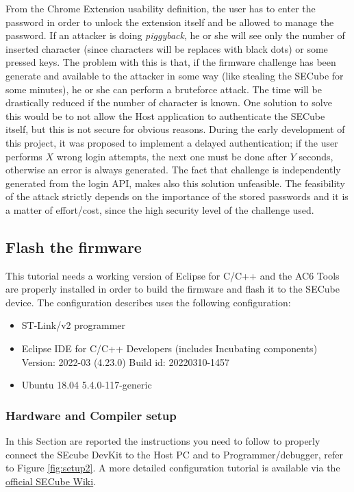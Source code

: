 From the Chrome Extension usability definition, the user has to enter the password in order to unlock the extension itself and be allowed to manage the password. If an attacker is doing \textit{piggyback}, he or she will see only the number of inserted character (since characters will be replaces with black dots) or some pressed keys. The problem with this is that, if the firmware challenge has been generate and available to the attacker in some way (like stealing the SECube for some minutes), he or she can perform a bruteforce attack. The time will be drastically reduced if the number of character is known. One solution to solve this would be to not allow the Host application to authenticate the SECube itself, but this is not secure for obvious reasons. 
During the early development of this project, it was proposed to implement a delayed authentication; if the user performs $X$ wrong login attempts, the next one must be done after $Y$ seconds, otherwise an error is always generated. The fact that challenge is independently generated from the login API, makes also this solution unfeasible. The feasibility of the attack strictly depends on the importance of the stored passwords and it is a matter of effort/cost, since the high security level of the challenge used.


\subsection{Flash the firmware}
This tutorial needs a working version of Eclipse for C/C++ and the AC6 Tools are properly installed in order to build the firmware and flash it to the SECube device. The configuration describes uses the following configuration:
\begin{itemize}
	\item ST-Link/v2 programmer
	\item Eclipse IDE for C/C++ Developers (includes Incubating components) Version: 2022-03 (4.23.0) Build id: 20220310-1457
	\item Ubuntu 18.04 5.4.0-117-generic
\end{itemize}

\subsubsection{Hardware and Compiler setup}
In this Section are reported the instructions you need to follow to properly connect the SEcube DevKit to the Host PC and to Programmer/debugger, refer to Figure \ref{fig:setup2}. A more detailed configuration tutorial is available via the  \href{https://github.com/SEcube-Project/SEcube-SDK/blob/master/wiki/wiki_rel_012.pdf}{official SECube Wiki}.

